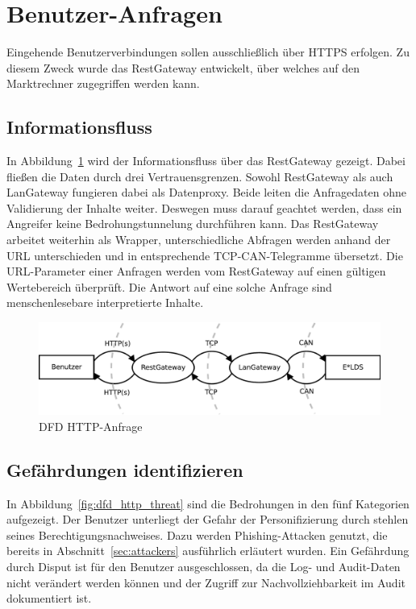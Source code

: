 \documentclass[11pt,a4paper]{report}
\begin{document}
\section{Benutzer-Anfragen} \label{sec:model_http}

Eingehende Benutzerverbindungen sollen ausschließlich über HTTPS erfolgen. Zu diesem Zweck wurde das RestGateway entwickelt, über welches auf den Marktrechner zugegriffen werden kann. 

\subsection{Informationsfluss}

In Abbildung~\ref{fig:dfd_http} wird der Informationsfluss über das RestGateway gezeigt. Dabei fließen die Daten durch drei Vertrauensgrenzen. Sowohl RestGateway als auch LanGateway fungieren dabei als Datenproxy. Beide leiten die Anfragedaten ohne Validierung der Inhalte weiter. Deswegen muss darauf geachtet werden, dass ein Angreifer keine Bedrohungstunnelung durchführen kann. Das RestGateway arbeitet weiterhin als Wrapper, unterschiedliche Abfragen werden anhand der URL unterschieden und in entsprechende TCP-CAN-Telegramme übersetzt. Die URL-Parameter einer Anfragen werden vom RestGateway auf einen gültigen Wertebereich überprüft. Die Antwort auf eine solche Anfrage sind menschenlesebare interpretierte Inhalte.

\begin{figure}[htbp]
\centering
\includegraphics[scale=0.6]{images/dfd_http.pdf}
\caption{DFD HTTP-Anfrage}
\label{fig:dfd_http}
\end{figure}

\subsection{Gefährdungen identifizieren}

In Abbildung~\ref{fig:dfd_http_threat} sind die Bedrohungen in den fünf Kategorien aufgezeigt. Der Benutzer unterliegt der Gefahr der Personifizierung durch stehlen seines Berechtigungsnachweises. Dazu werden Phishing-Attacken genutzt, die bereits in Abschnitt~\ref{sec:attackers} ausführlich erläutert wurden. Ein Gefährdung durch Disput ist für den Benutzer ausgeschlossen, da die Log- und Audit-Daten nicht verändert werden können und der Zugriff zur Nachvollziehbarkeit im Audit dokumentiert ist. 
\end{document}
